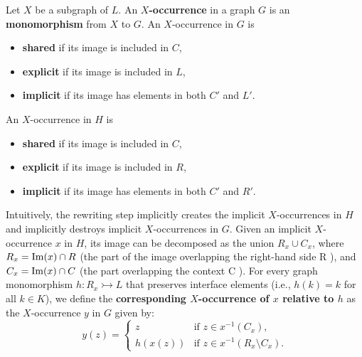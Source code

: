 \begin{definition}
    \label{def:x_occurrence}
     Let $X$ be a subgraph of $L$.  An \textbf{$X$-occurrence} in a graph $G$ is an \textbf{monomorphism} from $X$ to $G$. An $X$-occurrence in $G$ is 
    \begin{itemize}
        \item \textbf{shared} if its image is included in $C$,
        \item \textbf{explicit} if its image is  included in $L$,
        \item \textbf{implicit} if its image has elements in both $C'$ and $L'$.
    \end{itemize}  
    An $X$-occurrence in $H$ is 
    \begin{itemize}
        \item \textbf{shared} if its image is included in $C$,
        \item \textbf{explicit} if its image is included in $R$,
        \item \textbf{implicit} if its image has elements in both $C'$ and $R'$.
    \end{itemize} 

    Intuitively, the rewriting step implicitly creates the implicit $X$-occurrences in $H$ and implicitly destroys implicit $X$-occurrences in $G$. Given an implicit $X$-occurrence $x$ in $H$, its image can be decomposed as the union $R_x \cup C_x$, where $R_x = \operatorname{Im}(x) \cap R$ (the part of the image overlapping the right-hand side R ), and $C_x = \operatorname{Im}(x) \cap C$ (the part overlapping the context C ). For every graph monomorphism $h : R_x \rightarrowtail L$ that preserves interface elements (i.e., \( h(k) = k \) for all \( k \in K \)), we define the \textbf{corresponding $X$-occurrence of $x$ relative to $h$} as the $X$-occurrence $y$ in $G$ given by:
        $$
        y(z) = 
        \begin{cases}
        z & \text{if } z \in x^{-1}(C_x), \\
        h(x(z)) & \text{if } z \in x^{-1}(R_x \setminus C_x).
        \end{cases}
        $$
   \end{definition} 





